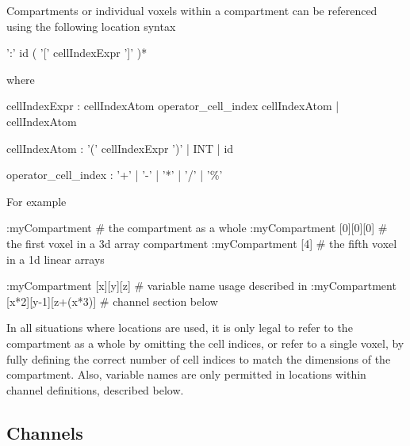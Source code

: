 Compartments or individual voxels within a compartment can be referenced using the following location syntax
\begin{bnfsource}
':' id ( '[' cellIndexExpr ']' )*
\end{bnfsource}
where
\begin{bnfsource}
cellIndexExpr :
  cellIndexAtom operator_cell_index cellIndexAtom
  | cellIndexAtom
  
cellIndexAtom :
  '(' cellIndexExpr ')'
  | INT
  | id
  
operator_cell_index :
  '+' | '-' | '*' | '/' | '\%'
\end{bnfsource}
For example
\begin{kappasource}
:myCompartment                     # the compartment as a whole
:myCompartment [0][0][0]           # the first voxel in a 3d array compartment
:myCompartment [4]                 # the fifth voxel in a 1d linear arrays

:myCompartment [x][y][z]           # variable name usage described in
:myCompartment [x*2][y-1][z+(x*3)] #   channel section below
\end{kappasource}

In all situations where locations are used, it is only legal to refer to the compartment as a whole by omitting the cell indices, or refer to a single voxel, by fully defining the correct number of cell indices to match the dimensions of the compartment. Also, variable names are only permitted in locations within channel definitions, described below.

\subsection{Channels}

